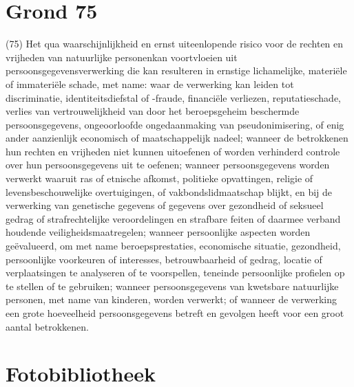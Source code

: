 \documentclass{bachproef-tin}
\begin{document}
\section{Grond 75}
\textcite{Comissie2018}
(75) Het qua waarschijnlijkheid en ernst uiteenlopende risico voor de rechten en vrijheden van natuurlijke personenkan voortvloeien uit persoonsgegevensverwerking die kan resulteren in ernstige lichamelijke, materiële of immateriële schade, met name: waar de verwerking kan leiden tot discriminatie, identiteitsdiefstal of -fraude, financiële verliezen, reputatieschade, verlies van vertrouwelijkheid van door het beroepsgeheim beschermde persoonsgegevens, ongeoorloofde ongedaanmaking van pseudonimisering, of enig ander aanzienlijk economisch of maatschappelijk nadeel; wanneer de betrokkenen hun rechten en vrijheden niet kunnen uitoefenen of worden verhinderd controle over hun persoonsgegevens uit te oefenen; wanneer persoonsgegevens worden verwerkt waaruit ras of etnische afkomst, politieke opvattingen, religie of levensbeschouwelijke overtuigingen, of vakbondslidmaatschap blijkt, en bij de verwerking van genetische gegevens of gegevens over gezondheid of seksueel gedrag of strafrechtelijke veroordelingen en strafbare feiten of daarmee verband houdende veiligheidsmaatregelen; wanneer persoonlijke aspecten worden geëvalueerd, om met name beroepsprestaties, economische situatie, gezondheid, persoonlijke voorkeuren of interesses, betrouwbaarheid of gedrag, locatie of verplaatsingen te analyseren of te voorspellen, teneinde persoonlijke profielen op te stellen of te gebruiken; wanneer persoonsgegevens van kwetsbare natuurlijke personen, met name van kinderen, worden verwerkt; of wanneer de verwerking een grote hoeveelheid persoonsgegevens betreft en gevolgen heeft voor een groot aantal betrokkenen.

\section{Fotobibliotheek}
\end{document}
